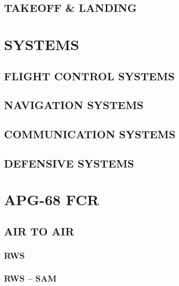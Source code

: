 \documentclass[fontInter]{TechCheck}
\begin{document}
	\clearpage
	
	\section{TAKEOFF \& LANDING}

	

	\cleardoublepage

	\chapter{SYSTEMS}
	\minitoc
	\cleardoublepage

	\section{FLIGHT CONTROL SYSTEMS}

	\clearpage

	\section{NAVIGATION SYSTEMS}

	\clearpage

	\section{COMMUNICATION SYSTEMS}

	\clearpage
	
	\section{DEFENSIVE SYSTEMS}

	\clearpage

	\cleardoublepage

	\chapter{APG-68 FCR}
	\minitoc
	\cleardoublepage

	\section{AIR TO AIR}
	
	\subsection{RWS}

	\subsection{RWS -- SAM}
\end{document}
